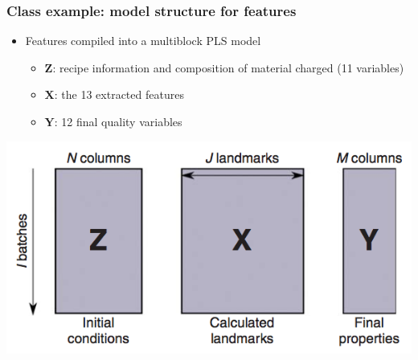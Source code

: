 \begin{frame}\frametitle{Class example: model structure for features}

	\begin{itemize}
		\item	Features compiled into a multiblock PLS model
		
				\begin{itemize}
					\item	\( \mathbf{Z} \): recipe information and composition of material charged (11 variables)
					
					\item	\( \mathbf{X} \): the 13 extracted features
					
					\item	\( \mathbf{Y} \): 12 final quality variables
				\end{itemize}
	\end{itemize}
	
	\begin{center}
		\includegraphics[width=\textwidth]{images/fmc/fmc-features-multiblock.png}
	\end{center}
\end{frame}

